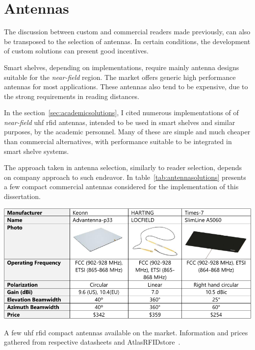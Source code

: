 \section{Antennas}

The discussion between custom and commercial readers made previously, can also be transposed to the selection of antennas. In certain conditions, the development of custom solutions can present good incentives.

Smart shelves, depending on implementations, require mainly antenna designs suitable for the \emph{near-field} region.
The market offers generic high performance antennas for most applications. These antennas also tend to be expensive, due to the strong requirements in reading distances. 

In the section~\ref{sec:academicsolutions}, I cited numerous implementations of of \emph{near-field} \ac{uhf} \ac{rfid} antennas, intended to be used in smart shelves and similar purposes, by the academic personnel. Many of these are simple and much cheaper than commercial alternatives, with performance suitable to be integrated in smart shelve systems. 

The approach taken in antenna selection, similarly to reader selection, depends on company approach to such endeavor. 
In table~\ref{tab:antennasolutions} presents a few compact commercial antennas considered for the implementation of this dissertation.

\begin{table}
    \centering
    \includegraphics[width=\linewidth]{./figs/02-state-of-the-art/table_antennas.pdf}
    \caption[A few \ac{uhf} \ac{rfid} compact antennas available on the market]{A few \ac{uhf} \ac{rfid} compact antennas available on the market. Information and prices gathered from respective datasheets and AtlasRFIDstore~\cite{AtlasRFIDstoreBuyRFID}.}
    \label{tab:antennasolutions}
\end{table}

